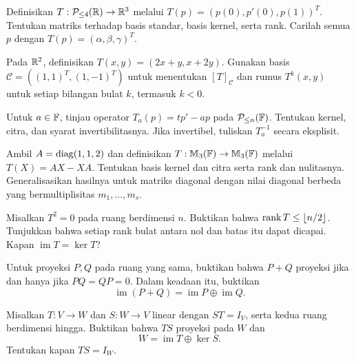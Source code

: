 \begin{latihan}\label{trans:lat-jet}
    Definisikan $T:\mathcal P_{\le4}(\mathbb{R})\to\mathbb{R}^3$ melalui
    $T(p)=(p(0),p'(0),p(1))^T$.
    Tentukan matriks terhadap basis standar, basis kernel,
    serta rank. Carilah semua $p$ dengan $T(p)=(\alpha,\beta,\gamma)^T$.
\end{latihan}

\begin{latihan}\label{trans:lat-basis}
    Pada $\mathbb{R}^2$, definisikan $T(x,y)=(2x+y,x+2y)$.
    Gunakan basis $\mathcal C=((1,1)^T,(1,-1)^T)$ untuk
    menentukan $[T]_{\mathcal C}$ dan rumus $T^k(x,y)$
    untuk setiap bilangan bulat $k$, termasuk $k<0$.
\end{latihan}

\begin{latihan}\label{trans:lat-euler}
    Untuk $a\in\mathbb{F}$, tinjau operator
    $T_a(p)=tp'-ap$ pada $\mathcal P_{\le n}(\mathbb{F})$.
    Tentukan kernel, citra, dan syarat invertibilitasnya.
    Jika invertibel, tuliskan $T_a^{-1}$ secara eksplisit.
\end{latihan}

\begin{latihan}\label{trans:lat-komutator}
    Ambil $A=\operatorname{diag}(1,1,2)$ dan definisikan
    $T:\mathbb{M}_3(\mathbb{F})\to\mathbb{M}_3(\mathbb{F})$ melalui $T(X)=AX-XA$.
    Tentukan basis kernel dan citra serta rank dan nulitasnya.
    Generalisasikan hasilnya untuk matriks diagonal dengan
    nilai diagonal berbeda yang bermultiplisitas $m_1,\ldots,m_s$.
\end{latihan}

\begin{latihan}\label{trans:lat-kuadrat-nol}
    Misalkan $T^2=0$ pada ruang berdimensi $n$.
    Buktikan bahwa $\operatorname{rank} T\le\lfloor n/2\rfloor$.
    Tunjukkan bahwa setiap rank bulat antara nol dan batas itu
    dapat dicapai. Kapan $\operatorname{im}T=\ker T$?
\end{latihan}

\begin{latihan}\label{trans:lat-dua-proyeksi}
    Untuk proyeksi $P,Q$ pada ruang yang sama, buktikan bahwa
    $P+Q$ proyeksi jika dan hanya jika $PQ=QP=0$.
    Dalam keadaan itu, buktikan
    \[
        \operatorname{im}(P+Q)=\operatorname{im}P\oplus\operatorname{im}Q.
    \]
\end{latihan}

\begin{latihan}\label{trans:lat-invers-sepihak}
    Misalkan $T:V\to W$ dan $S:W\to V$ linear dengan
    $ST=I_V$, serta kedua ruang berdimensi hingga.
    Buktikan bahwa $TS$ proyeksi pada $W$ dan
    \[
        W=\operatorname{im}T\oplus\ker S.
    \]
    Tentukan kapan $TS=I_W$.
\end{latihan}

